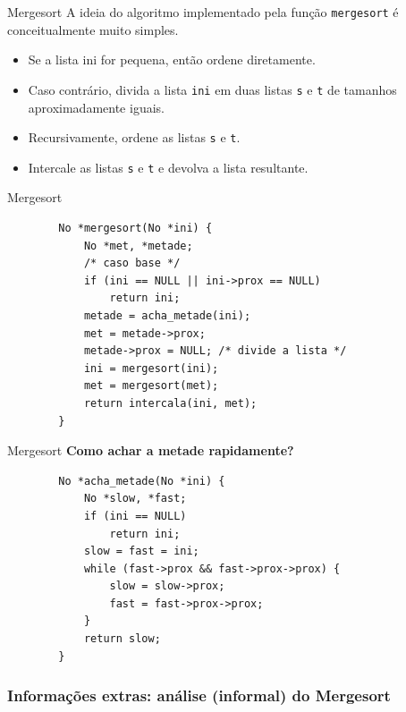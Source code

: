 \documentclass{beamer}
\newcommand{\cod}[1]{\texttt{#1}}
\newcommand{\textcolortwo}[2]{\textcolor{#1}{#2}}
\newcommand{\textblue}[1]{\textcolortwo{uiblue}{#1}}
\begin{document}
\begin{frame}[fragile]{Mergesort}
    A ideia do algoritmo implementado pela função \cod{mergesort} é conceitualmente muito simples.
    \begin{itemize}
        \item Se a lista \textblue{ini} for pequena, então ordene diretamente.
        \item Caso contrário, divida a lista \cod{ini} em duas listas \cod{s} e \cod{t} de tamanhos aproximadamente iguais.
        \item Recursivamente, ordene as listas \cod{s} e \cod{t}.
        \item Intercale as listas \cod{s} e \cod{t} e devolva a lista resultante.
    \end{itemize}
\end{frame}

\begin{frame}[fragile]{Mergesort}
    \begin{verbatim}
        No *mergesort(No *ini) {
            No *met, *metade;
            /* caso base */
            if (ini == NULL || ini->prox == NULL)
                return ini;
            metade = acha_metade(ini);
            met = metade->prox;
            metade->prox = NULL; /* divide a lista */
            ini = mergesort(ini);
            met = mergesort(met);
            return intercala(ini, met);
        }
    \end{verbatim}
\end{frame}

\begin{frame}[fragile]{Mergesort}
    \textbf{Como achar a metade rapidamente?}

    \begin{verbatim}
        No *acha_metade(No *ini) {
            No *slow, *fast;
            if (ini == NULL)
                return ini;
            slow = fast = ini;
            while (fast->prox && fast->prox->prox) {
                slow = slow->prox;
                fast = fast->prox->prox;
            }
            return slow;
        }
    \end{verbatim}
\end{frame}

\subsubsection{Informações extras: análise (informal) do Mergesort}
\end{document}
